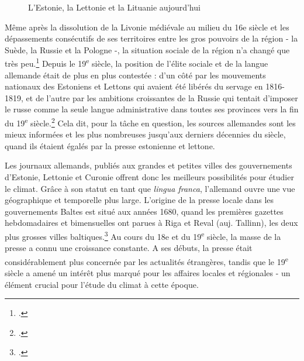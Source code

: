 \documentclass[a4paper,twoside,12pt]{article}
\begin{document}
\begin{figure}[!h]
\begin{minipage}[b]{0.5\textwidth}
    \captionsetup{width=0.9\linewidth}
    \caption{L'Estonie, la Lettonie et la Lituanie aujourd'hui}
    \label{fig:balticcountries}
\end{minipage}
\end{figure}

Même après la dissolution de la Livonie médiévale au milieu du 16e siècle et les dépassements consécutifs de ses territoires entre les gros pouvoirs de la région - la Suède, la Russie et la Pologne -, la situation sociale de la région n'a changé que très peu.\footcites[Paradoxalement, l'allemand reste un élément unifiant à l'époque d'États-nations unitaires, au moins dans le domaine de l'historiographie. Les traitements scientifiques qui prennent en compte la région entière sous la forme et sous les critères qu'elle avait avant le XXe siècle sont ainsi souvent publiés en allemand. Pour les relations internes et externes des pays baltes à partir du Moyen Age jusqu'à la fin du XIXe siècle, cf. p. ex.][]{anton_deutschland_2005}{angermann_baltischen_2015}{muhlpfordt_baltische_2016}{sommerlat-michas_baltikum_2015}{hormuth_livonia_2012} Depuis le 19\textsuperscript{e} siècle, la position de l'élite sociale et de la langue allemande était de plus en plus contestée : d'un côté par les mouvements nationaux des Estoniens et Lettons qui avaient été libérés du servage en 1816-1819, et de l'autre par les ambitions croissantes de la Russie qui tentait d'imposer le russe comme la seule langue administrative dans toutes ses provinces vers la fin du 19\textsuperscript{e} siècle.\footcites[Les tensions culturelles et nationales entre les diverses peuples et minorités de la région, ainsi que leurs relations aux différents pouvoirs politiques externes sont les mieux présentées dans][]{angermann_ostseeprovinzen_2005}{plath_esten_2011} Cela dit, pour la tâche en question, les sources allemandes sont les mieux informées et les plus nombreuses jusqu'aux derniers décennies du siècle, quand ils étaient égalés par la presse estonienne et lettone.

Les journaux allemands, publiés aux grandes et petites villes des gouvernements d'Estonie, Lettonie et Curonie offrent donc les meilleurs possibilités pour étudier le climat. Grâce à son statut en tant que \textit{lingua franca}, l'allemand ouvre une vue géographique et temporelle plus large. L'origine de la presse locale dans les gouvernements Baltes est situé aux années 1680, quand les premières gazettes hebdomadaires et bimensuelles ont parues à Riga et Reval (auj. Tallinn), les deux plus grosses villes baltiques.\footcites[][16-17]{vanamolder_was_2011}{peegel_eesti_1994} Au cours du 18e et du 19\textsuperscript{e} siècle, la masse de la presse a connu une croissance constante. A ses débuts, la presse était considérablement plus concernée par les actualités étrangères, tandis que le 19\textsuperscript{e} siècle a amené un intérêt plus marqué pour les affaires locales et régionales - un élément crucial pour l'étude du climat à cette époque.
\end{document}
